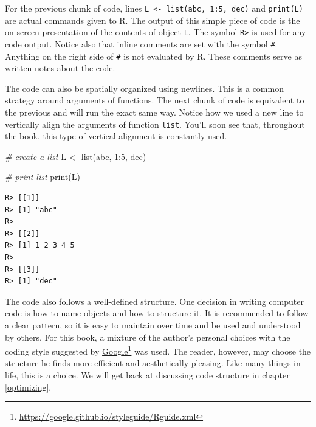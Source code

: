 \documentclass[
  12pt,
]{book}
\newenvironment{Shaded}{\begin{snugshade}}{\end{snugshade}}
\newcommand{\CommentTok}[1]{\textcolor[rgb]{0.37,0.37,0.37}{\textit{#1}}}
\newcommand{\DecValTok}[1]{\textcolor[rgb]{0.06,0.06,0.06}{#1}}
\newcommand{\FunctionTok}[1]{\textcolor[rgb]{0,0,0}{#1}}
\newcommand{\NormalTok}[1]{#1}
\newcommand{\OtherTok}[1]{\textcolor[rgb]{0.37,0.37,0.37}{#1}}
\newcommand{\SpecialCharTok}[1]{\textcolor[rgb]{0,0,0}{#1}}
\newcommand{\StringTok}[1]{\textcolor[rgb]{0.5,0.5,0.5}{#1}}
\begin{document}
For the previous chunk of code, lines \texttt{L\ \textless{}-\ list(\textquotesingle{}abc\textquotesingle{},\ 1:5,\ \textquotesingle{}dec\textquotesingle{})} and \texttt{print(L)} are actual commands given to R. The output of this simple piece of code is the on-screen presentation of the contents of object \texttt{L}. The symbol \texttt{R\textgreater{}} is used for any code output. Notice also that inline comments are set with the symbol \texttt{\#}. Anything on the right side of \texttt{\#} is not evaluated by R. These comments serve as written notes about the code.

The code can also be spatially organized using newlines. This is a common strategy around arguments of functions. The next chunk of code is equivalent to the previous and will run the exact same way. Notice how we used a new line to vertically align the arguments of function \texttt{list}. You'll soon see that, throughout the book, this type of vertical alignment is constantly used.

\begin{Shaded}
\begin{Highlighting}[]
\CommentTok{\# create a list}
\NormalTok{L }\OtherTok{\textless{}{-}} \FunctionTok{list}\NormalTok{(}\StringTok{\textquotesingle{}abc\textquotesingle{}}\NormalTok{, }
          \DecValTok{1}\SpecialCharTok{:}\DecValTok{5}\NormalTok{, }
          \StringTok{\textquotesingle{}dec\textquotesingle{}}\NormalTok{)}

\CommentTok{\# print list}
\FunctionTok{print}\NormalTok{(L)}
\end{Highlighting}
\end{Shaded}

\begin{verbatim}
R> [[1]]
R> [1] "abc"
R> 
R> [[2]]
R> [1] 1 2 3 4 5
R> 
R> [[3]]
R> [1] "dec"
\end{verbatim}

The code also follows a well-defined structure. One decision in writing computer code is how to name objects and how to structure it. It is recommended to follow a clear pattern, so it is easy to maintain over time and be used and understood by others. For this book, a mixture of the author's personal choices with the coding style suggested by \href{https://google.github.io/styleguide/Rguide.xml}{Google}\footnote{\url{https://google.github.io/styleguide/Rguide.xml}} was used. The reader, however, may choose the structure he finds more efficient and aesthetically pleasing. Like many things in life, this is a choice. We will get back at discussing code structure in chapter \ref{optimizing}.
\end{document}

